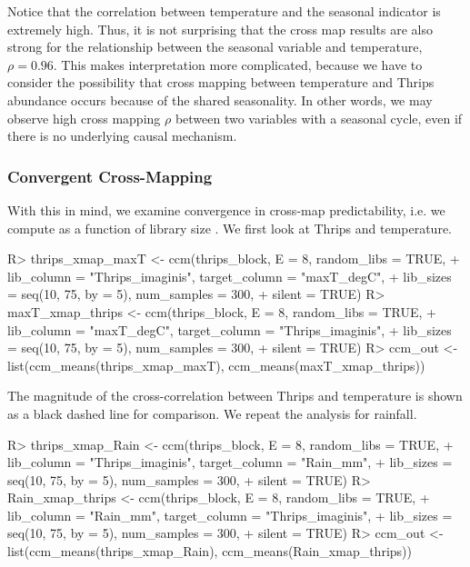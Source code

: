 \documentclass[article]{jss}
\begin{document}
Notice that the correlation between temperature and the seasonal indicator is extremely high. Thus, it is not surprising that the cross map results are also strong for the relationship between the seasonal variable and temperature, $\rho = 0.96$. This makes interpretation more complicated, because we have to consider the possibility that cross mapping between temperature and Thrips abundance occurs because of the shared seasonality. In other words, we may observe high cross mapping $\rho$ between two variables with a seasonal cycle, even if there is no underlying causal mechanism.

\subsubsection{Convergent Cross-Mapping}\label{sec:thrips-ccm}
With this in mind, we examine convergence in cross-map predictability, i.e. we compute  as a function of library size . We first look at Thrips and temperature.

\begin{Schunk}
\begin{Sinput}
R> thrips_xmap_maxT <- ccm(thrips_block, E = 8, random_libs = TRUE,
+                          lib_column = "Thrips_imaginis", target_column = "maxT_degC",
+                          lib_sizes = seq(10, 75, by = 5), num_samples = 300, 
+                          silent = TRUE)
R> maxT_xmap_thrips <- ccm(thrips_block, E = 8, random_libs = TRUE,
+                          lib_column = "maxT_degC", target_column = "Thrips_imaginis",
+                          lib_sizes = seq(10, 75, by = 5), num_samples = 300, 
+                          silent = TRUE)
R> ccm_out <- list(ccm_means(thrips_xmap_maxT), ccm_means(maxT_xmap_thrips))
\end{Sinput}
\end{Schunk}




The magnitude of the cross-correlation between Thrips and temperature is shown as a black dashed line for comparison. We repeat the analysis for rainfall.

\begin{Schunk}
\begin{Sinput}
R> thrips_xmap_Rain <- ccm(thrips_block, E = 8, random_libs = TRUE,
+                          lib_column = "Thrips_imaginis", target_column = "Rain_mm",
+                          lib_sizes = seq(10, 75, by = 5), num_samples = 300, 
+                          silent = TRUE)
R> Rain_xmap_thrips <- ccm(thrips_block, E = 8, random_libs = TRUE,
+                          lib_column = "Rain_mm", target_column = "Thrips_imaginis",
+                          lib_sizes = seq(10, 75, by = 5), num_samples = 300, 
+                          silent = TRUE)
R> ccm_out <- list(ccm_means(thrips_xmap_Rain), ccm_means(Rain_xmap_thrips))
\end{Sinput}
\end{Schunk}
\end{document}
